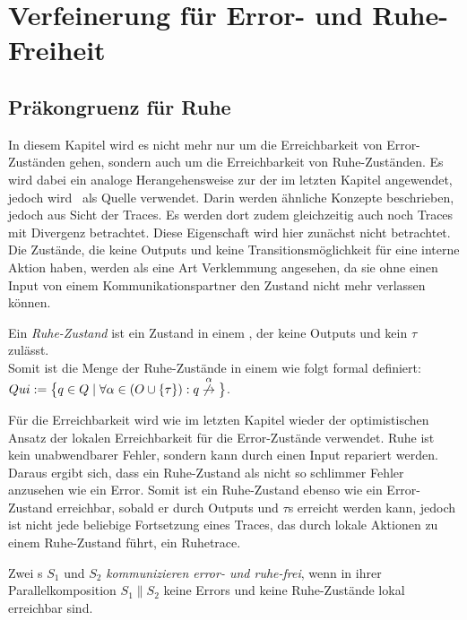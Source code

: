 \chapter{Verfeinerung für Error- und Ruhe-Freiheit}

\section{Präkongruenz für Ruhe}

In diesem Kapitel wird es nicht mehr nur um die Erreichbarkeit von
Error-Zuständen gehen, sondern auch um die Erreichbarkeit von
Ruhe-Zuständen. Es wird dabei ein analoge Herangehensweise zur der im letzten
Kapitel angewendet, jedoch wird~\cite{Chilton2013} als Quelle verwendet. Darin
werden ähnliche Konzepte beschrieben, jedoch aus Sicht der Traces. Es werden
dort zudem gleichzeitig auch noch Traces mit Divergenz betrachtet. Diese
Eigenschaft wird hier zunächst nicht betrachtet.\\
Die Zustände, die keine Outputs und keine Transitionsmöglichkeit für
eine interne Aktion haben, werden als eine Art Verklemmung angesehen, da sie
ohne einen Input von einem Kommunikationspartner den Zustand nicht mehr
verlassen können.

\begin{Def}[Ruhe]
  Ein \emph{Ruhe-Zustand} ist ein Zustand in einem \EIO{}, der keine
  Outputs und kein $\tau$ zulässt.\\
  Somit ist die Menge der Ruhe-Zustände in einem \EIO{} wie folgt formal
  definiert: $Qui:=\big\{q\in Q\mid \forall \alpha\in (O\cup \{\tau\}): q
  \overset{\alpha}{\not{\hspace{-0.1cm}\rightarrow}}\big\}$.
\end{Def}

Für die Erreichbarkeit wird wie im letzten Kapitel wieder der
optimistischen Ansatz der lokalen Erreichbarkeit für die Error-Zustände
verwendet. Ruhe ist kein unabwendbarer Fehler, sondern kann durch einen Input
repariert werden. Daraus ergibt sich, dass ein Ruhe-Zustand als nicht so
\glqq{}schlimmer Fehler\grqq{} anzusehen wie ein Error. Somit ist ein
Ruhe-Zustand ebenso wie ein Error-Zustand erreichbar, sobald er durch Outputs
und $\tau$s erreicht werden kann, jedoch ist nicht jede beliebige Fortsetzung
eines Traces, das durch lokale Aktionen zu einem Ruhe-Zustand führt, ein
Ruhetrace.

\begin{Def}
  Zwei \EIO{}s $S_1$ und $S_2$ \emph{kommunizieren error- und ruhe-frei}, wenn
  in ihrer Parallelkomposition $S_1\| S_2$ keine Errors und keine Ruhe-Zustände
  lokal erreichbar sind.
\end{Def}

